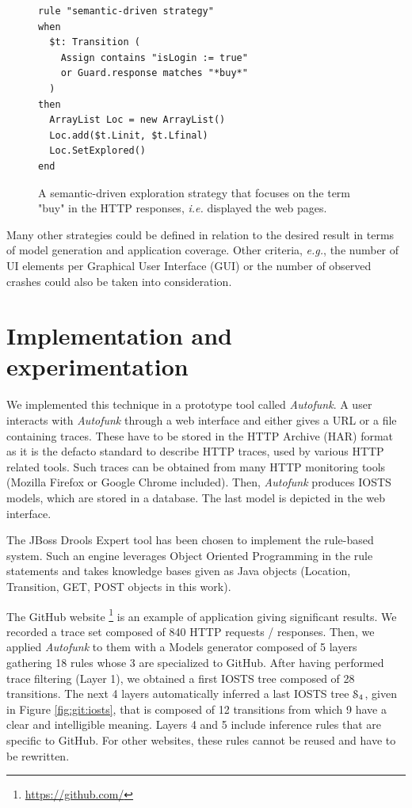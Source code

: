 \begin{figure}[h]
\begin{framed}
\begin{BVerbatim}
rule "semantic-driven strategy"
when
  $t: Transition (
    Assign contains "isLogin := true"
    or Guard.response matches "*buy*"
  )
then
  ArrayList Loc = new ArrayList()
  Loc.add($t.Linit, $t.Lfinal)
  Loc.SetExplored()
end
\end{BVerbatim}
\end{framed}

\caption{A semantic-driven exploration strategy that focuses on
the term "buy" in the HTTP responses, \emph{i.e.} displayed the web
pages.}
\label{fig:rule:semdriven}
\end{figure}

Many other strategies could be defined in relation to the desired
result in terms of model generation and application coverage.
Other criteria, \emph{e.g.}, the number of UI elements per Graphical User
Interface (GUI) or the number of observed crashes could also be
taken into consideration.


\section{Implementation and experimentation}
\label{sec:modelinf:webapps:exp}

We implemented this technique in a prototype tool called
\textit{Autofunk}. A user interacts with \textit{Autofunk} through a web
interface and either gives a URL  or a file containing traces.
These have to be stored in the HTTP Archive (HAR) format as it is
the defacto standard to describe HTTP traces, used by various
HTTP related tools. Such traces can be obtained from many HTTP
monitoring tools (Mozilla Firefox or Google Chrome included).
Then, \textit{Autofunk} produces IOSTS models, which are stored in a
database. The last model is depicted in the web interface.

The JBoss Drools Expert tool has been chosen to implement the
rule-based system. Such an engine leverages Object Oriented
Programming in the rule statements and takes knowledge bases
given as Java objects (Location, Transition, GET, POST objects in
this work).

The GitHub website \footnote{\url{https://github.com/}} is an example
of application giving significant results. We recorded a trace
set composed of 840 HTTP requests / responses. Then, we applied
\textit{Autofunk} to them with a Models generator composed of 5 layers
gathering 18 rules whose 3 are specialized to GitHub. After
having performed trace filtering (Layer 1), we obtained a first
IOSTS tree composed of 28 transitions. The next 4 layers
automatically inferred a last IOSTS tree $\EuScript{S}_4$, given
in Figure \ref{fig:git:iosts}, that is composed of 12 transitions
from which 9 have a clear and intelligible meaning. Layers 4 and
5 include inference rules that are specific to GitHub. For other
websites, these rules cannot be reused and have to be rewritten.

